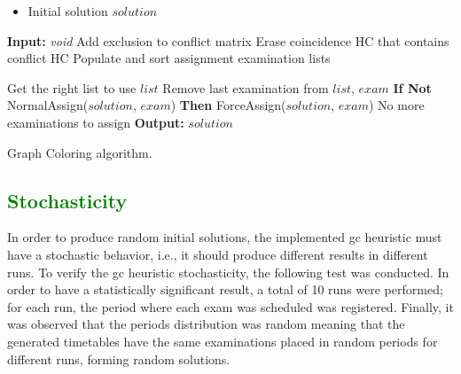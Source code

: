 
\begin{algorithm}
\begin{itemize}
\item Initial solution $solution$
\end{itemize}

\begin{algorithmic}[1]
\State \textbf{Input:} \textit{void} 
\State Add exclusion to conflict matrix
\State Erase coincidence HC that contains conflict HC
\State Populate and sort assignment examination lists

\Repeat
	\State Get the right list to use $list$
	\State Remove last examination from $list$, $exam$
	\State \textbf{If Not} NormalAssign($solution$, $exam$) \textbf{Then} ForceAssign($solution$, $exam$)
\Until No more examinations to assign
\State  \textbf{Output:} $solution$
\end{algorithmic}
\caption{Graph Coloring algorithm.}
\label{alg:GraphColoring}
\end{algorithm}

\subsection{\textcolor{green}{Stochasticity}}

In order to produce random initial solutions, the implemented \gls{gc} heuristic must have a stochastic behavior, i.e., it should produce different results in different runs. To verify the \gls{gc} heuristic stochasticity, the following test was conducted. In order to have a statistically significant result, a total of 10 runs were performed; for each run, the period where each exam was scheduled was registered. Finally, it was observed that the periods distribution was random meaning that the generated timetables have the same examinations placed in random periods for different runs, forming random solutions.

